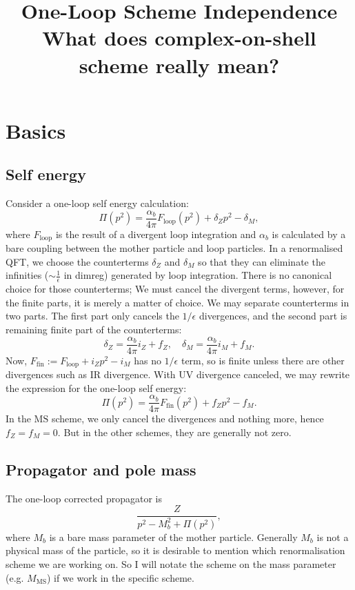 \documentclass[11pt]{article}
\theoremstyle{definition}
\theoremstyle{remark}
\begin{document}
	\title{One-Loop Scheme Independence\\ \small What does complex-on-shell scheme really mean?}
	\maketitle
	\section{Basics}
	\subsection{Self energy}
	Consider a one-loop self energy calculation:
	\[\Pi(p^{2})=\frac{\alpha_{b}}{4\pi}F_{\text{loop}}(p^{2})+\delta_{Z}p^{2}-\delta_{M},\]
	where $F_{\text{loop}}$ is the result of a divergent loop integration and $\alpha_{b}$ is calculated by a bare coupling between the mother particle and loop particles.
	In a renormalised QFT, we choose the counterterms $\delta_{Z}$ and $\delta_{M}$ so that they can eliminate the infinities ($\sim\frac{1}{\epsilon}$ in dimreg) generated by loop integration.
	There is no canonical choice for those counterterms;
	We must cancel the divergent terms, however, for the finite parts, it is merely a matter of choice.
	We may separate counterterms in two parts.
	The first part only cancels the $1/\epsilon$ divergences, and the second part is remaining finite part of the counterterms:
	\[\delta_{Z}=\frac{\alpha_{b}}{4\pi}i_{Z}+f_{Z},\quad\delta_{M}=\frac{\alpha_{b}}{4\pi}i_{M}+f_{M}.\]
	Now, $F_{\text{fin}}:=F_{\text{loop}}+i_{Z}p^{2}-i_{M}$ has no $1/\epsilon$ term, so is finite unless there are other divergences such as IR divergence.
	With UV divergence canceled, we may rewrite the expression for the one-loop self energy:
	\[\Pi(p^{2})=\frac{\alpha_{b}}{4\pi}F_{\text{fin}}(p^{2})+f_{Z}p^{2}-f_{M}.\]
	In the $\mathrm{MS}$ scheme, we only cancel the divergences and nothing more, hence $f_{Z}=f_{M}=0$.
	But in the other schemes, they are generally not zero.
	
	\subsection{Propagator and pole mass}
	The one-loop corrected propagator is
	\[\frac{Z}{p^{2}-M_{b}^{2}+\Pi(p^{2})},\]
	where $M_{b}$ is a bare mass parameter of the mother particle.
	Generally $M_{b}$ is not a physical mass of the particle, so it is desirable to mention which renormalisation scheme we are working on.
	So I will notate the scheme on the mass parameter (e.g. $M_{\mathrm{MS}}$) if we work in the specific scheme.
	
\end{document}
